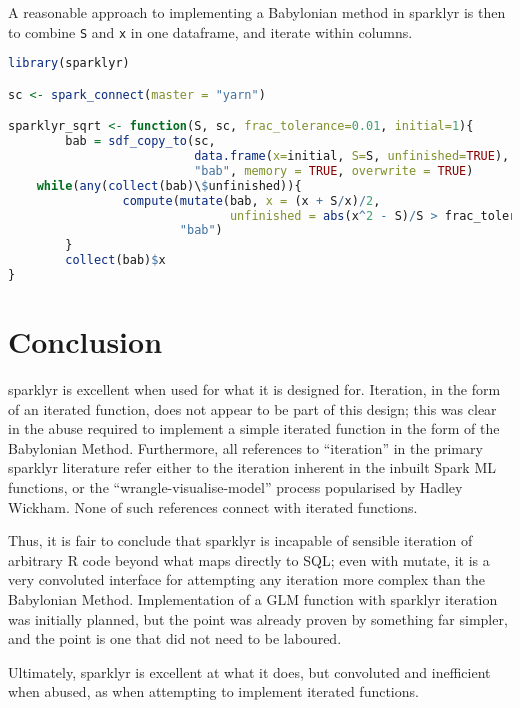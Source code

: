\documentclass[10pt,a4paper]{article}
\begin{document}
A reasonable approach to implementing a Babylonian method in sparklyr is then
to combine \texttt{S} and \texttt{x} in one dataframe, and iterate within
columns.

\begin{lstlisting}[language=R, caption={Babylonian method implementation using sparklyr}, label=lst:sparklyr-bab]
library(sparklyr)

sc <- spark_connect(master = "yarn")

sparklyr_sqrt <- function(S, sc, frac_tolerance=0.01, initial=1){
        bab = sdf_copy_to(sc,
                          data.frame(x=initial, S=S, unfinished=TRUE),
                          "bab", memory = TRUE, overwrite = TRUE)
	while(any(collect(bab)\$unfinished)){
                compute(mutate(bab, x = (x + S/x)/2,
                               unfinished = abs(x^2 - S)/S > frac_tolerance),
                        "bab")
        }
        collect(bab)$x
}
\end{lstlisting}


\section{Conclusion}\label{sec:conclusion}

sparklyr is excellent when used for what it is designed for.
Iteration, in the form of an iterated function, does not appear to be part of
this design;
this was clear in the abuse required to implement a simple iterated function in
the form of the Babylonian Method.
Furthermore, all references to ``iteration'' in the primary sparklyr literature
refer either to the iteration inherent in the inbuilt Spark ML functions, or
the ``wrangle-visualise-model'' process popularised by Hadley
Wickham\cite{luraschi2019mastering}\cite{wickham2016r}.
None of such references connect with iterated functions.

Thus, it is fair to conclude that sparklyr is incapable of sensible iteration
of arbitrary R code beyond what maps directly to SQL; 
even with mutate, it is a very convoluted interface for attempting any
iteration more complex than the Babylonian Method.
Implementation of a GLM function with sparklyr iteration was initially planned,
but the point was already proven by something far simpler, and the point is one
that did not need to be laboured.

Ultimately, sparklyr is excellent at what it does, but convoluted and inefficient when
abused, as when attempting to implement iterated functions.

\printbibliography{}
\end{document}

